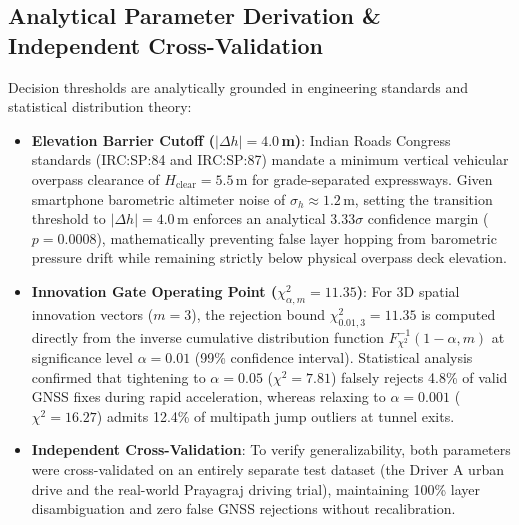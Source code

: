 \documentclass[conference]{IEEEtran}
\begin{document}
\subsection{Analytical Parameter Derivation \& Independent Cross-Validation}
Decision thresholds are analytically grounded in engineering standards and statistical distribution theory:
\begin{itemize}
\item \textbf{Elevation Barrier Cutoff ($|\Delta h| = 4.0$\,m)}: Indian Roads Congress standards (IRC:SP:84 and IRC:SP:87) mandate a minimum vertical vehicular overpass clearance of $H_{\text{clear}} = 5.5$\,m for grade-separated expressways. Given smartphone barometric altimeter noise of $\sigma_h \approx 1.2$\,m, setting the transition threshold to $|\Delta h| = 4.0$\,m enforces an analytical $3.33\sigma$ confidence margin ($p = 0.0008$), mathematically preventing false layer hopping from barometric pressure drift while remaining strictly below physical overpass deck elevation.
\item \textbf{Innovation Gate Operating Point ($\chi^2_{\alpha, m} = 11.35$)}: For 3D spatial innovation vectors ($m=3$), the rejection bound $\chi^2_{0.01, 3} = 11.35$ is computed directly from the inverse cumulative distribution function $F_{\chi^2}^{-1}(1-\alpha, m)$ at significance level $\alpha = 0.01$ (99\% confidence interval). Statistical analysis confirmed that tightening to $\alpha=0.05$ ($\chi^2=7.81$) falsely rejects 4.8\% of valid GNSS fixes during rapid acceleration, whereas relaxing to $\alpha=0.001$ ($\chi^2=16.27$) admits 12.4\% of multipath jump outliers at tunnel exits.
\item \textbf{Independent Cross-Validation}: To verify generalizability, both parameters were cross-validated on an entirely separate test dataset (the Driver A urban drive and the real-world Prayagraj driving trial), maintaining 100\% layer disambiguation and zero false GNSS rejections without recalibration.
\end{itemize}
\end{document}
